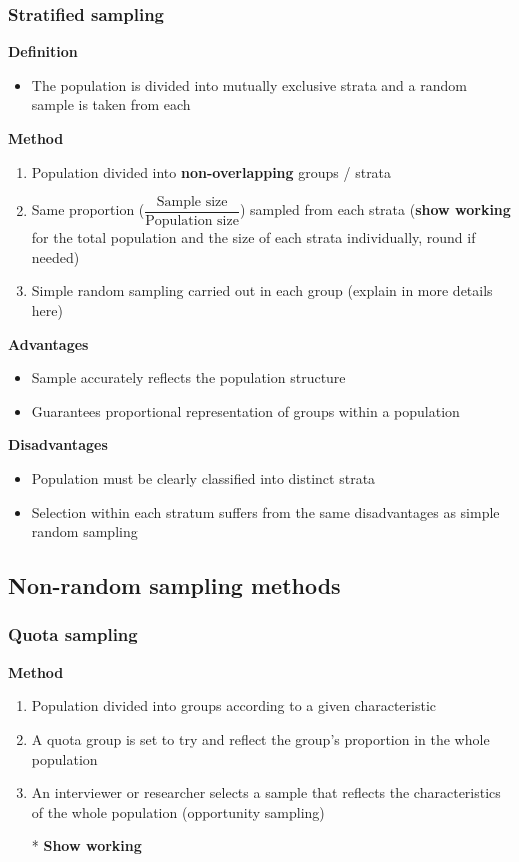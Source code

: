 \documentclass[A4paper, 11pt]{article}
\begin{document}
	\subsubsection{Stratified sampling}
	\textbf{Definition}
	\begin{itemize}
		\item The population is divided into mutually exclusive strata and a random sample is taken from each
	\end{itemize}
	\textbf{Method}
	\begin{enumerate}
		\item Population divided into \textbf{non-overlapping} groups / strata
		\item Same proportion ($\dfrac{\text{Sample size}}{\text{Population size}}$) sampled from each strata (\textbf{show working} for the total population and the size of each strata individually, round if needed)
		\item Simple random sampling carried out in each group (explain in more details here)
	\end{enumerate}
	\textbf{Advantages}
	\begin{itemize}
		\item Sample accurately reflects the population structure
		\item Guarantees proportional representation of groups within a population
	\end{itemize}
	\textbf{Disadvantages}
	\begin{itemize}
		\item Population must be clearly classified into distinct strata
		\item Selection within each stratum suffers from the same disadvantages as simple random sampling
	\end{itemize}
	\subsection{Non-random sampling methods}
	\subsubsection{Quota sampling}
	\textbf{Method}
	\begin{enumerate}
		\item Population divided into groups according to a given characteristic
		\item A quota group is set to try and reflect the group's proportion in the whole population
		\item An interviewer or researcher selects a sample that reflects the characteristics of the whole population (opportunity sampling)
		\item[*] \textbf{Show working}
	\end{enumerate}
	
\end{document}
